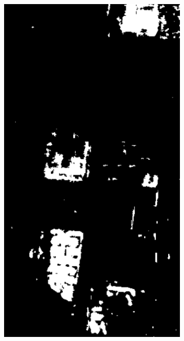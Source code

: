 \begin{figure}[t]
\begin{subfigure}[b]{0.2\columnwidth}
		\includegraphics[width=\textwidth]{Figures/CD/REF_A2}
		\caption{}
		\label{fig:3_c}
\end{subfigure}
\hspace{0.01pt}
\begin{subfigure}[b]{0.2\columnwidth}

\end{subfigure}
\end{figure}
